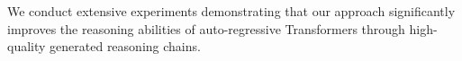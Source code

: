 We conduct extensive experiments demonstrating that our approach significantly improves the reasoning abilities of auto-regressive Transformers through high-quality generated reasoning chains.








